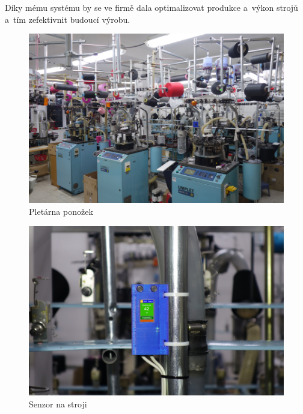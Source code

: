 Díky mému systému by se ve firmě dala optimalizovat produkce a~výkon strojů a~tím zefektivnit budoucí výrobu. 

\begin{figure}[htbp]
    \centering
    \includegraphics[width=\textwidth]{img/pletarna.png}
    \caption{Pletárna ponožek}
    \label{fig:Pletarna}
\end{figure}

\begin{figure}[htbp]
    \centering
    \includegraphics[width=\textwidth]{img/V2-uchyceni.png}
    \caption{Senzor na stroji}
    \label{fig:SenzorNaStroji}
\end{figure}


\newpage
